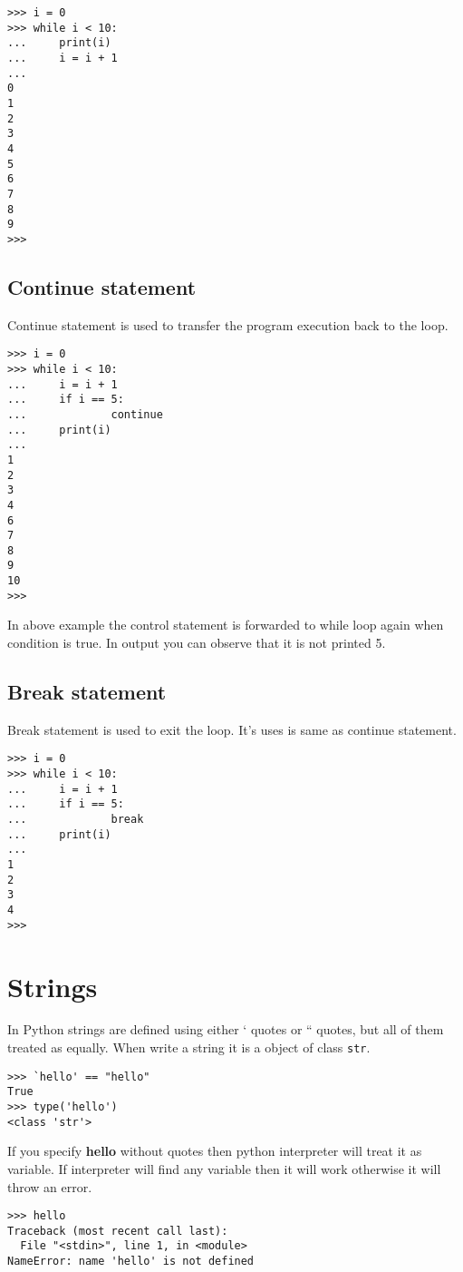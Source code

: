 \documentclass[letterpaper,12pt]{book}
\begin{document}
\begin{verbatim}
>>> i = 0
>>> while i < 10:
...     print(i)
...     i = i + 1
... 
0
1
2
3
4
5
6
7
8
9
>>> 
\end{verbatim}

\subsection{Continue statement}
Continue statement is used to transfer the program execution back to the loop.

\begin{verbatim}
>>> i = 0
>>> while i < 10:
...     i = i + 1
...     if i == 5:
...             continue
...     print(i)
... 
1
2
3
4
6
7
8
9
10
>>> 
\end{verbatim}
In above example the control statement is forwarded to while loop again when condition is true. In output you can observe that it is not printed 5.

\subsection{Break statement}
Break statement is used to exit the loop. It's uses is same as continue statement.
\begin{verbatim}
>>> i = 0
>>> while i < 10:
...     i = i + 1
...     if i == 5:
...             break
...     print(i)
... 
1
2
3
4
>>> 
\end{verbatim}

\section{Strings}
In Python strings are defined using either ` quotes or `` quotes, but all of them treated as equally. When write a string it is a object of class \texttt{str}. 
\begin{verbatim}
>>> `hello' == "hello"
True
>>> type('hello')
<class 'str'>
\end{verbatim}
If you specify \textbf{hello} without quotes then python interpreter will treat it as variable. If interpreter will find any variable then it will work otherwise it will throw an error.
\begin{verbatim}
>>> hello
Traceback (most recent call last):
  File "<stdin>", line 1, in <module>
NameError: name 'hello' is not defined
\end{verbatim}
\end{document}
